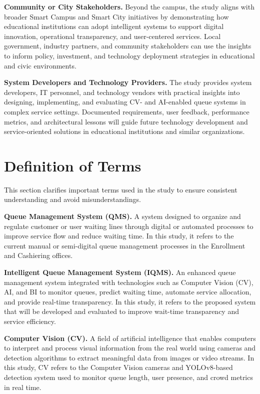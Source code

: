 \documentclass{research}
\begin{document}
\medskip
\indent\textbf{Community or City Stakeholders.} Beyond the campus, the study aligns with broader Smart Campus and Smart City initiatives by demonstrating how educational institutions can adopt intelligent systems to support digital innovation, operational transparency, and user-centered services. Local government, industry partners, and community stakeholders can use the insights to inform policy, investment, and technology deployment strategies in educational and civic environments.

\medskip
\indent\textbf{System Developers and Technology Providers.} The study provides system developers, IT personnel, and technology vendors with practical insights into designing, implementing, and evaluating CV- and AI-enabled queue systems in complex service settings. Documented requirements, user feedback, performance metrics, and architectural lessons will guide future technology development and service-oriented solutions in educational institutions and similar organizations.

\section{Definition of Terms}

This section clarifies important terms used in the study to ensure consistent understanding and avoid misunderstandings.

\medskip
\indent\textbf{Queue Management System (QMS).} A system designed to organize and regulate customer or user waiting lines through digital or automated processes to improve service flow and reduce waiting time. In this study, it refers to the current manual or semi-digital queue management processes in the Enrollment and Cashiering offices.

\medskip
\indent\textbf{Intelligent Queue Management System (IQMS).} An enhanced queue management system integrated with technologies such as Computer Vision (CV), AI, and BI to monitor queues, predict waiting time, automate service allocation, and provide real-time transparency. In this study, it refers to the proposed system that will be developed and evaluated to improve wait-time transparency and service efficiency.

\medskip
\indent\textbf{Computer Vision (CV).} A field of artificial intelligence that enables computers to interpret and process visual information from the real world using cameras and detection algorithms to extract meaningful data from images or video streams. In this study, CV refers to the Computer Vision cameras and YOLOv8-based detection system used to monitor queue length, user presence, and crowd metrics in real time.
\end{document}
